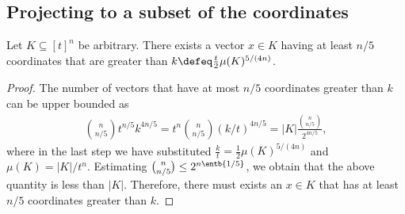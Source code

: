 \subsection{Projecting to a subset of the coordinates}
\label{sec:ham:isoperimetry:proj}
\begin{lemma}
\label{lem:find-prod}
Let $K\subseteq [t]^n$ be arbitrary. 
There exists a vector $x\in K$ having at least $n/5$ 
coordinates that are greater than 
$k\defeq\frac{t}{2}\mu(K)^{5/(4n)}$.
\end{lemma}
\begin{proof}
The number of vectors that have at most $n/5$ coordinates 
greater than $k$ can be upper bounded as 
\begin{align*}
{n\choose n/5} t^{n/5} k^{4n/5} 
= t^n {n\choose n/5} (k/t)^{4n/5} 
= |K|\frac{{n \choose n/5}}{2^{4n /5}},
\end{align*}
where in the last step we have substituted
$\frac{k}{t}=\frac{1}{2}\mu(K)^{5/(4n)}$ and 
$\mu(K) = |K| / t^n$.
Estimating ${n\choose n/5}\le 2^{n\entb{1/5}}$, 
we obtain that the above quantity is less than $|K|$.
Therefore, there must exists an $x\in K$ that has at least 
$n/5$ coordinates greater than $k$.
\end{proof}

